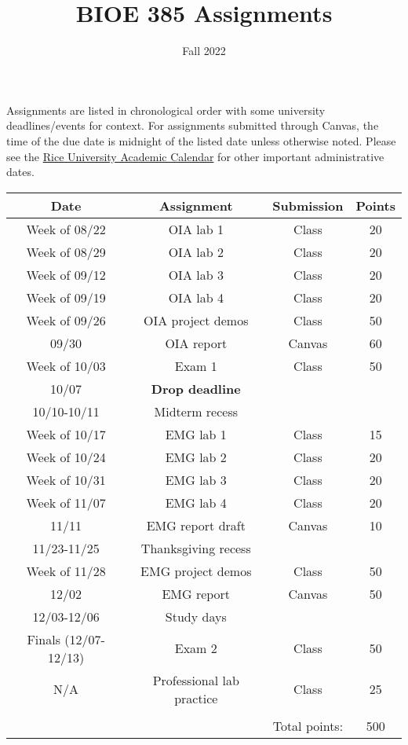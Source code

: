 \documentclass{article}
\title{BIOE 385 Assignments}
\author{Fall 2022}
\date{}
\begin{document}
\maketitle
Assignments are listed in chronological order with some university deadlines/events for context. For assignments submitted through Canvas, the time of the due date is midnight of the listed date unless otherwise noted. Please see the \href{https://registrar.rice.edu/calendars/fall-semester-2022}{Rice University Academic Calendar} for other important administrative dates.\\

\begin{table}[h!]
	\centering
\begin{tabular}[h!]{cccc}
\toprule
	Date & Assignment & Submission & Points\\
	\midrule
	Week of 08/22 & OIA lab 1 & Class & 20\\
	Week of 08/29 & OIA lab 2 & Class & 20\\
	Week of 09/12 & OIA lab 3 & Class & 20\\
	Week of 09/19 & OIA lab 4 & Class & 20\\
	Week of 09/26 & OIA project demos & Class & 50\\
	09/30 & OIA report & Canvas & 60\\
	Week of 10/03 & Exam 1 & Class & 50\\
	\midrule
	10/07 & \textbf{Drop deadline} & &\\
	10/10-10/11 & Midterm recess & &\\
	\midrule
	Week of 10/17 & EMG lab 1 & Class & 15\\
	Week of 10/24 & EMG lab 2 & Class & 20\\
	Week of 10/31 & EMG lab 3 & Class & 20\\
	Week of 11/07 & EMG lab 4 & Class & 20\\
	11/11 & EMG report draft & Canvas & 10\\
	\midrule
	11/23-11/25 & Thanksgiving recess & &\\
	\midrule
	Week of 11/28 & EMG project demos & Class & 50\\
	12/02 & EMG report & Canvas & 50\\
	\midrule
	12/03-12/06 & Study days & &\\
	\midrule
	Finals (12/07-12/13) & Exam 2 & Class & 50\\
	N/A & Professional lab practice & Class & 25\\
	\bottomrule
	\\
	& & Total points: & 500\\
\end{tabular}
\end{table}
\end{document}
